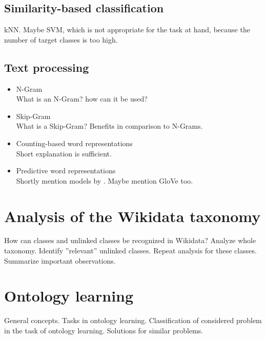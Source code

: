 \documentclass{scrartcl} %
\begin{document}
\subsection{Similarity-based classification}
kNN. Maybe SVM, which is not appropriate for the task at hand, because the number of target classes is too high.
\citeauthor{Chen2009} \cite{Chen2009}\\
\citeauthor{Zhang2015} \cite{Zhang2015}

\subsection{Text processing}
\begin{itemize}
\item N-Gram \\
	What is an N-Gram? how can it be used?
	\citeauthor{Jurafsky2014} \cite{Jurafsky2014}
\item Skip-Gram \\
	What is a Skip-Gram? Benefits in comparison to N-Grams.
	\citeauthor{Guthrie2006} \cite{Guthrie2006}
\item Counting-based word representations \\
	Short explanation is sufficient.
	\citeauthor{Levy2015} \cite{Levy2015}
\item Predictive word representations \\
	Shortly mention models by \citeauthor{Mikolov2013}. Maybe mention GloVe too.
	\citeauthor{Levy2015} \cite{Levy2015}
\end{itemize}

\section{Analysis of the Wikidata taxonomy}
How can classes and unlinked classes be recognized in Wikidata?
Analyze whole taxonomy. Identify ''relevant'' unlinked classes. Repeat analysis for these classes.
Summarize important observations.

\section{Ontology learning}
General concepts. Tasks in ontology learning. Classification of considered problem in the task of ontology learning.
Solutions for similar problems. \\
\citeauthor{Cimiano2009} \cite{Cimiano2009}\\
\citeauthor{Wong2012} \cite{Wong2012}\\
\citeauthor{dAmato16} \cite{dAmato16}\\
\citeauthor{Petrucci16} \cite{Petrucci16}\\
\citeauthor{Fu2014} \cite{Fu2014}
\end{document}
